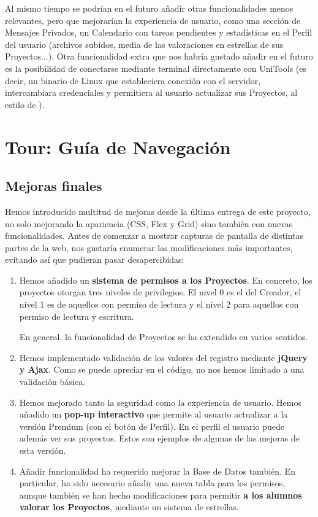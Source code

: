 \documentclass[12pt]{report}
\begin{document}
Al mismo tiempo se podrían en el futuro añadir otras funcionalidades menos relevantes, pero que mejorarían la experiencia de usuario, como una sección de Mensajes Privados, un Calendario con tareas pendientes y estadísticas en el Perfil del usuario (archivos subidos, media de las valoraciones en estrellas de sus Proyectos...). Otra funcionalidad extra que nos habría gustado añadir en el futuro es la posibilidad de conectarse mediante terminal directamente con UniTools (es decir, un binario de Linux que estableciera conexión con el servidor, intercambiara credenciales y permitiera al usuario actualizar sus Proyectos, al estilo de ).

\section{Tour: Guía de Navegación}
\subsection{Mejoras finales}
Hemos introducido multitud de mejoras desde la última entrega de este proyecto, no solo mejorando la apariencia (CSS, Flex y Grid) sino también con nuevas funcionalidades. Antes de comenzar a mostrar capturas de pantalla de distintas partes de la web, nos gustaría enumerar las modificaciones más importantes, evitando así que pudieran pasar desapercibidas:
\begin{enumerate}
    \item Hemos añadido un \textbf{sistema de permisos a los Proyectos}. En concreto, los proyectos otorgan tres niveles de privilegios. El nivel 0 es el del Creador, el nivel 1 es de aquellos con permiso de lectura y el nivel 2 para aquellos con permiso de lectura y escritura.
    
    En general, la funcionalidad de Proyectos se ha extendido en varios sentidos.
    
    \item Hemos implementado validación de los valores del registro mediante \textbf{jQuery y Ajax}. Como se puede apreciar en el código, no nos hemos limitado a una validación básica.
    
    \item Hemos mejorado tanto la seguridad como la experiencia de usuario. Hemos añadido un \textbf{pop-up interactivo} que permite al usuario actualizar a la versión Premium (con el botón de Perfil). En el perfil el usuario puede además ver sus proyectos. Estos son ejemplos de algunas de las mejoras de esta versión.
    
    \item Añadir funcionalidad ha requerido mejorar la Base de Datos también. En particular, ha sido necesario añadir una nueva tabla para los permisos, aunque también se han hecho modificaciones para permitir \textbf{a los alumnos valorar los Proyectos}, mediante un sistema de estrellas.
\end{enumerate}
\end{document}
